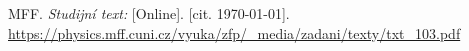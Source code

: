 
\begin{thebibliography}{9}
 MFF. \emph{Studijní text:} [Online]. [cit. \today]. \newline \url{https://physics.mff.cuni.cz/vyuka/zfp/_media/zadani/texty/txt_103.pdf}

\end{thebibliography}
